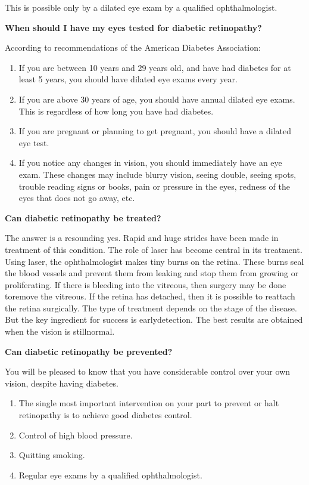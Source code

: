 This is possible only by a dilated eye exam by a qualified ophtha\-lmologist.

\vskip 4pt
\noindent\textbf{When should I have my eyes tested for diabetic retinopathy?}
\vskip 4pt

\noindent According to recommendations of the American Diabetes Association:

\vspace{-\topsep}
\begin{enumerate}[•]
\itemsep=0pt
\item If you are between 10 years and 29 years old, and have had diabetes for at least 5 years, you should have dilated eye exams every year.
\item If you are above 30 years of age, you should have annual dilated eye exams. This is regardless of how long you have had diabetes.
\item If you are pregnant or planning to get pregnant, you should have a dilated eye test.
\item If you notice any changes in vision, you should immediately have an eye exam. These changes may include blurry vision, seeing double, seeing spots, trouble reading signs or books, pain or pressure in the eyes, redness of the eyes that does not go away, etc.
\end{enumerate}
\vspace{-\topsep}

\noindent\textbf{Can diabetic retinopathy be treated?}

The answer is a resounding yes. Rapid and huge strides have been made in treatment of this condition. The role of laser has become central in its treatment. Using laser, the ophthalmologist makes tiny burns on the retina. These burns seal the blood vessels and prevent them from leaking and stop them from growing or proliferating. If there is bleeding into the vitreous, then surgery may be done to\break remove the vitreous. If the retina has detached, then it is possible to reattach the retina surgically. The type of treatment depends on the stage of the disease. But the key ingredient for success is early\break detection. The best results are obtained when the vision is still\break normal.

\noindent\textbf{Can diabetic retinopathy be prevented?}

You will be pleased to know that you have considerable control over your own vision, despite having diabetes.

\vspace{-\topsep}
\begin{enumerate}[•]
\itemsep=0pt
\item The single most important intervention on your part to prevent or halt retinopathy is to achieve good diabetes control.
\item Control of high blood pressure.
\item Quitting smoking.
\item Regular eye exams by a qualified ophthalmologist.
\end{enumerate}
\vspace{-\topsep}

